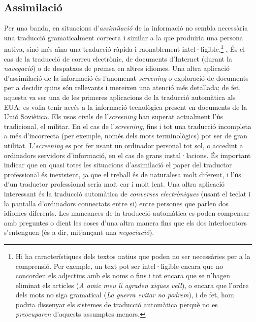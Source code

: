 \subsection{Assimilació} 
\label{s3:assim}
Per una banda, en situacions d'{\em assimilació} de la informació no
sembla necessària una traducció gramaticalment correcta i similar a la
que produiria una persona nativa, sinó més aïna una traducció ràpida i
raonablement intel·ligible.\footnote{Hi ha característiques
  dels textos natius que poden no ser necessàries per a la
  comprensió. Per exemple, un text pot ser intel·ligible encara que no
  concorden els adjectius amb els noms o fins i tot encara que se
  n'hagen eliminat els articles (\emph{A amic meu li agraden xiques
    vell}), o encara que l'ordre dels mots no siga gramatical
  (\emph{La guerra evitar no podrem}), i de fet, hom podria dissenyar els sistemes de traducció automàtica perquè no es \emph{preocuparen} d'aquests assumptes menors.} , És el cas de la traducció de
  correu electrònic, de documents d'Internet (durant la
  \emph{navegació}) o de despatxos de premsa en altres idiomes.  Una
  altra aplicació d'assimilació de la informació és l'anomenat
  \emph{screening} o exploració de documents per a decidir quins són
  rellevants i mereixen una atenció més detallada; de fet, aquesta va
  ser una de les primeres aplicacions de la traducció automàtica als
  EUA: es volia tenir accés a la informació tecnològica present en
  documents de la Unió Soviètica. Els usos civils de
  l'\emph{screening} han superat actualment l'ús tradicional, el
  militar. En el cas de l'\emph{screening}, fins i tot una traducció
  incompleta a més d'incorrecta (per exemple, només dels mots
  terminològics) pot ser de gran utilitat.  L'\emph{screening} es pot
  fer usant un ordinador personal tot sol, o accedint a ordinadors
  servidors d'informació, en el cas de grans instal·lacions. És
  important indicar que en quasi totes les situacions d'assimilació el
  paper del traductor professional és inexistent, ja que el treball és
  de naturalesa molt diferent, i l'ús d'un traductor professional
  seria molt car i molt lent.  Una altra aplicació interessant és la
  traducció automàtica de \emph{converses electròniques} (usant el
  teclat i la pantalla d'ordinadors connectats entre si) entre
  persones que parlen dos idiomes diferents. Les mancances de la
  traducció automàtica es poden compensar amb preguntes o dient les
  coses d'una altra manera fins que els dos interlocutors s'entenguen
  (és a dir, mitjançant una \emph{negociació}).

